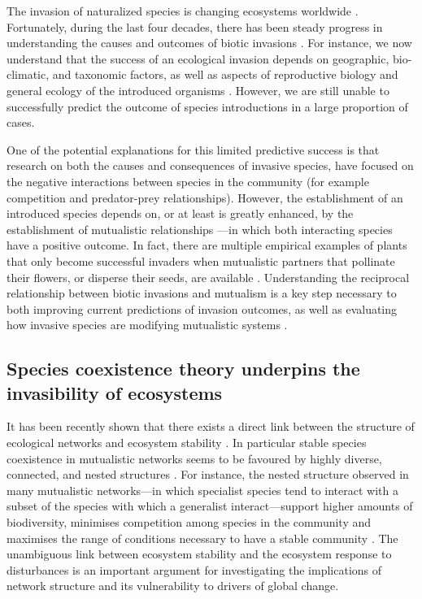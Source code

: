 \documentclass[a4paper]{article}
\begin{document}
The invasion of naturalized species is changing ecosystems worldwide \autocite{Loevei1997, Ehrenfeld2010}.
Fortunately, during the last four decades, there has been steady progress in understanding the causes and outcomes of biotic invasions \autocite{Romanuk2009, Powell2011}.
For instance, we now understand that the success of an ecological invasion depends on geographic, bio-climatic, and taxonomic factors, as well as aspects of reproductive biology and general ecology of the introduced organisms \autocite{Simberloff1999, Richardson2000, Strayer2012, Thomsen2014, Galiana2014}.
However, we are still unable to successfully predict the outcome of species introductions in a large proportion of cases.

One of the potential explanations for this limited predictive success is that research on both the causes and consequences of invasive species, have focused on the negative interactions between species in the community (for example competition and predator-prey relationships).
However, the establishment of an introduced species depends on, or at least is greatly enhanced, by the establishment of  mutualistic relationships \autocite{Richardson2000}---in which both interacting species have a positive outcome.
In fact, there are multiple empirical examples of plants that only become successful invaders when mutualistic partners that pollinate their flowers, or disperse their seeds, are available \autocite{Simberloff1999, Simberloff2006, Prior2014}.
Understanding the reciprocal relationship between biotic invasions and mutualism is a key step necessary to both improving current predictions of invasion outcomes, as well as evaluating how invasive species are modifying mutualistic systems \autocite{Richardson2000}.

\subsection{Species coexistence theory underpins the invasibility of ecosystems}

It has been recently shown that there exists a direct link between the structure of ecological networks and ecosystem stability \autocite{Bascompte2006,Rooney2006,Okuyama2008,Bastolla2009, Tylianakis2010, Thebault2010,Rohr2014,Sauve2014}.
In particular stable species coexistence in mutualistic networks seems to be favoured by highly diverse, connected, and nested structures \autocite{Okuyama2008, Bastolla2009, Thebault2010, Sauve2014}.
For instance, the nested structure observed in many mutualistic networks---in which specialist species tend to interact with a subset of the species with which a generalist interact---support higher amounts of biodiversity, minimises competition among species in the community and maximises the range of conditions necessary to have a stable community \autocite{Bastolla2009, Rohr2014}.
The unambiguous link between ecosystem stability and the ecosystem response to disturbances is an important argument for investigating the implications of network structure and its vulnerability to drivers of global change.
\end{document}
